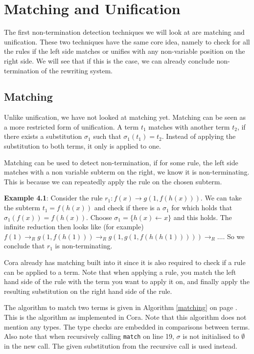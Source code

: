 \chapter{Matching and Unification}\label{matching-unification}
The first non-termination detection techniques we will look at are matching and unification. These two techniques have the same core idea, namely to check for all the rules if the left side matches or unifies with any non-variable position on the right side. We will see that if this is the case, we can already conclude non-termination of the rewriting system.

\section{Matching}
Unlike unification, we have not looked at matching yet. Matching can be seen as a more restricted form of unification. A term $t_1$ matches with another term $t_2$, if there exists a substitution $\sigma_1$ such that $\sigma_1(t_1) = t_2$. Instead of applying the substitution to both terms, it only is applied to one.

Matching can be used to detect non-termination, if for some rule, the left side matches with a non variable subterm on the right, we know it is non-terminating. This is because we can repeatedly apply the rule on the chosen subterm.

\textbf{Example 4.1}: Consider the rule $r_1: f(x) \rightarrow g(1, f(h(x)))$. We can take the subterm $t_1 = f(h(x))$ and check if there is a $\sigma_1$ for which holds that $\sigma_1(f(x)) = f(h(x))$. Choose $\sigma_1 = \{ h(x) \leftarrow x \}$ and this holds. The infinite reduction then looks like (for example) $f(1) \rightarrow_R g(1, f(h(1))) \rightarrow_R g(1, g(1, f(h(h(1))))) \rightarrow_R \dots$. So we conclude that $r_1$ is non-terminating. 

Cora already has matching built into it since it is also required to check if a rule can be applied to a term. Note that when applying a rule, you match the left hand side of the rule with the term you want to apply it on, and finally apply the resulting substitution on the right hand side of the rule.

The algorithm to match two terms is given in Algorithm \ref{matching} on page \pageref{matching}. This is the algorithm as implemented in Cora. Note that this algorithm does not mention any types. The type checks are embedded in comparisons between terms. Also note that when recursively calling \texttt{match} on line 19, $\sigma$ is not initialised to $\emptyset$ in the new call. The given substitution from the recursive call is used instead.

